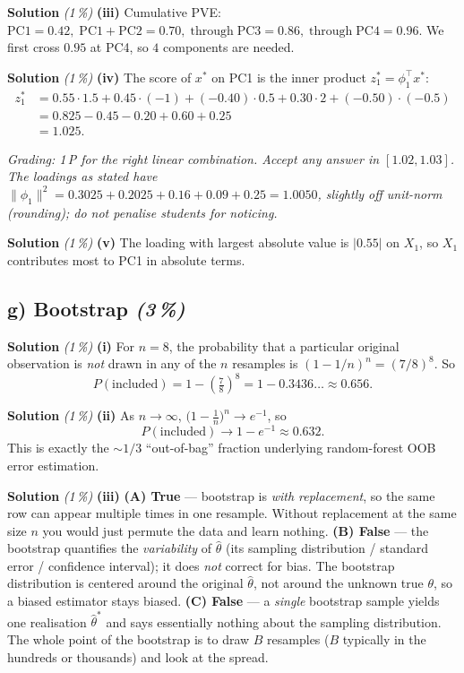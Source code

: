 \documentclass[11pt,a4paper]{article}
\newcommand{\subpoints}[1]{\textit{(#1\,\%)}}
\newcommand{\sol}{\noindent\textbf{Solution}}
\begin{document}
\medskip
\sol{} \subpoints{1} \textbf{(iii)} Cumulative PVE:
$\mathrm{PC1}=0.42,\;\mathrm{PC1\!+\!PC2}=0.70,\;\mathrm{through\;PC3}=0.86,\;\mathrm{through\;PC4}=0.96$.
We first cross $0.95$ at PC4, so $\boxed{4}$ components are needed.

\medskip
\sol{} \subpoints{1} \textbf{(iv)} The score of $x^*$ on PC1 is the inner product
$z^*_1 = \phi_1^\top x^*$:
\begin{align*}
z^*_1 &= 0.55\cdot 1.5 + 0.45\cdot(-1) + (-0.40)\cdot 0.5 + 0.30\cdot 2 + (-0.50)\cdot(-0.5) \\
      &= 0.825 - 0.45 - 0.20 + 0.60 + 0.25 \\
      &= \boxed{1.025}.
\end{align*}

\noindent\emph{Grading: 1\,P for the right linear combination. Accept any answer in $[1.02, 1.03]$.
The loadings as stated have $\|\phi_1\|^2 = 0.3025+0.2025+0.16+0.09+0.25 = 1.0050$, slightly off
unit-norm (rounding); do not penalise students for noticing.}

\medskip
\sol{} \subpoints{1} \textbf{(v)} The loading with largest absolute value is $|0.55|$ on
$\boxed{X_1}$, so $X_1$ contributes most to PC1 in absolute terms.

\subsection*{g) Bootstrap \subpoints{3}}

\sol{} \subpoints{1} \textbf{(i)} For $n=8$, the probability that a particular original observation
is \emph{not} drawn in any of the $n$ resamples is $(1-1/n)^n = (7/8)^8$. So
$$P(\text{included}) = 1 - \left(\tfrac{7}{8}\right)^{8} = 1 - 0.3436\ldots \approx \boxed{0.656}.$$

\medskip
\sol{} \subpoints{1} \textbf{(ii)} As $n\to\infty$,
$\bigl(1-\tfrac{1}{n}\bigr)^n \to e^{-1}$, so
$$P(\text{included}) \to 1 - e^{-1} \approx \boxed{0.632}.$$
This is exactly the $\sim 1/3$ ``out-of-bag'' fraction underlying random-forest OOB error
estimation.

\medskip
\sol{} \subpoints{1} \textbf{(iii)} \textbf{(A) True} --- bootstrap is \emph{with replacement}, so
the same row can appear multiple times in one resample. Without replacement at the same size $n$
you would just permute the data and learn nothing.
\textbf{(B) False} --- the bootstrap quantifies the \emph{variability} of $\hat\theta$ (its
sampling distribution / standard error / confidence interval); it does \emph{not} correct for bias.
The bootstrap distribution is centered around the original $\hat\theta$, not around the unknown
true $\theta$, so a biased estimator stays biased.
\textbf{(C) False} --- a \emph{single} bootstrap sample yields one realisation $\hat\theta^*$ and
says essentially nothing about the sampling distribution. The whole point of the bootstrap is to
draw $B$ resamples ($B$ typically in the hundreds or thousands) and look at the spread.
\end{document}
